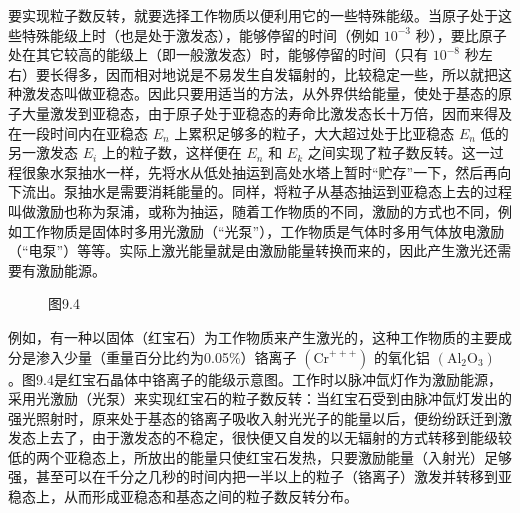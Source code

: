 要实现粒子数反转，就要选择工作物质以便利用它的一些特殊能级。当原子处于这些特殊能级上时（也是处于激发态），能够停留的时间（例如
\(10^{-3}\)
秒），要比原子处在其它较高的能级上（即一般激发态）时，能够停留的时间（只有
\(10^{-8}\)
秒左右）要长得多，因而相对地说是不易发生自发辐射的，比较稳定一些，所以就把这种激发态叫做亚稳态。因此只要用适当的方法，从外界供给能量，使处于基态的原子大量激发到亚稳态，由于原子处于亚稳态的寿命比激发态长十万倍，因而来得及在一段时间内在亚稳态
\(E_{n}\) 上累积足够多的粒子，大大超过处于比亚稳态 \(E_{n}\)
低的另一激发态 \(E_{i}\) 上的粒子数，这样便在 \(E_{n}\) 和 \(E_{k}\)
之间实现了粒子数反转。这一过程很象水泵抽水一样，先将水从低处抽运到高处水塔上暂时``贮存''一下，然后再向下流出。泵抽水是需要消耗能量的。同样，将粒子从基态抽运到亚稳态上去的过程叫做激励也称为泵浦，或称为抽运，随着工作物质的不同，激励的方式也不同，例如工作物质是固体时多用光激励（``光泵''），工作物质是气体时多用气体放电激励（``电泵''）等等。实际上激光能量就是由激励能量转换而来的，因此产生激光还需要有激励能源。

\begin{figure}
\centering
\caption{图9.4}
\end{figure}

例如，有一种以固体（红宝石）为工作物质来产生激光的，这种工作物质的主要成分是渗入少量（重量百分比约为0.05\%）铬离子
\(\left(\mathrm{Cr}^{+++}\right)\) 的氧化铝
\(\left(\mathrm{Al}_{2}\mathrm{O}_{3}\right)\)
。图9.4是红宝石晶体中铬离子的能级示意图。工作时以脉冲氙灯作为激励能源，采用光激励（光泵）来实现红宝石的粒子数反转：当红宝石受到由脉冲氙灯发出的强光照射时，原来处于基态的铬离子吸收入射光光子的能量以后，便纷纷跃迁到激发态上去了，由于激发态的不稳定，很快便又自发的以无辐射的方式转移到能级较低的两个亚稳态上，所放出的能量只使红宝石发热，只要激励能量（入射光）足够强，甚至可以在千分之几秒的时间内把一半以上的粒子（铬离子）激发并转移到亚稳态上，从而形成亚稳态和基态之间的粒子数反转分布。


